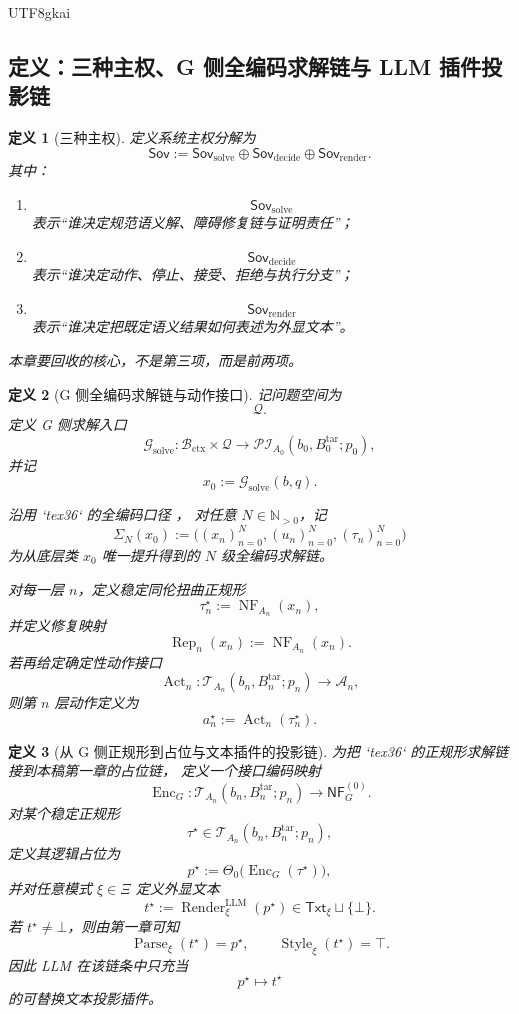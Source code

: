 \documentclass[12pt]{article}
\newtheorem{definition}{定义}[section]
\newcommand{\Parse}{\operatorname{Parse}}
\newcommand{\Render}{\operatorname{Render}}
\newcommand{\Style}{\operatorname{Style}}
\begin{document}
\begin{CJK*}{UTF8}{gkai}
\subsection{定义：三种主权、G 侧全编码求解链与 LLM 插件投影链}
\label{subsec:tex37-ch6-definitions}

\begin{definition}[三种主权]
\label{def:tex37-ch6-sovereignty}
定义系统主权分解为
\[
  \mathsf{Sov}
  :=
  \mathsf{Sov}_{\mathrm{solve}}
  \oplus
  \mathsf{Sov}_{\mathrm{decide}}
  \oplus
  \mathsf{Sov}_{\mathrm{render}}.
\]
其中：
\begin{enumerate}
  \item
  \[
    \mathsf{Sov}_{\mathrm{solve}}
  \]
  表示“谁决定规范语义解、障碍修复链与证明责任”；
  \item
  \[
    \mathsf{Sov}_{\mathrm{decide}}
  \]
  表示“谁决定动作、停止、接受、拒绝与执行分支”；
  \item
  \[
    \mathsf{Sov}_{\mathrm{render}}
  \]
  表示“谁决定把既定语义结果如何表述为外显文本”。
\end{enumerate}
本章要回收的核心，不是第三项，而是前两项。
\end{definition}

\begin{definition}[G 侧全编码求解链与动作接口]
\label{def:tex37-ch6-g-solve}
记问题空间为
\[
  \mathcal{Q}.
\]
定义 G 侧求解入口
\[
  \mathcal{G}_{\mathrm{solve}}:
  \mathcal{B}_{\mathrm{ctx}}\times\mathcal{Q}
  \to
  \mathcal{PI}_{A_0}(b_0,B_0^{\mathrm{tar}};p_0),
\]
并记
\[
  x_0:=\mathcal{G}_{\mathrm{solve}}(b,q).
\]

沿用 `tex36` 的全编码口径 \cite{RepoTex36HomotopyTwistBijection}，
对任意 $N\in\mathbb{N}_{>0}$，记
\[
  \Sigma_N(x_0)
  :=
  \bigl(
    (x_n)_{n=0}^{N},
    (u_n)_{n=0}^{N},
    (\tau_n)_{n=0}^{N}
  \bigr)
\]
为从底层类 $x_0$ 唯一提升得到的 $N$ 级全编码求解链。

对每一层 $n$，定义稳定同伦扭曲正规形
\[
  \tau_n^\star:=\operatorname{NF}_{A_n}(x_n),
\]
并定义修复映射
\[
  \operatorname{Rep}_n(x_n):=\operatorname{NF}_{A_n}(x_n).
\]
若再给定确定性动作接口
\[
  \operatorname{Act}_n:
  \mathcal{T}_{A_n}(b_n,B_n^{\mathrm{tar}};p_n)
  \to
  \mathcal{A}_n,
\]
则第 $n$ 层动作定义为
\[
  a_n^\star:=\operatorname{Act}_n(\tau_n^\star).
\]
\end{definition}

\begin{definition}[从 G 侧正规形到占位与文本插件的投影链]
\label{def:tex37-ch6-plugin}
为把 `tex36` 的正规形求解链接到本稿第一章的占位链，
定义一个接口编码映射
\[
  \operatorname{Enc}_G:
  \mathcal{T}_{A_n}(b_n,B_n^{\mathrm{tar}};p_n)
  \to
  \mathsf{NF}_G^{(0)}.
\]
对某个稳定正规形
\[
  \tau^\star\in \mathcal{T}_{A_n}(b_n,B_n^{\mathrm{tar}};p_n),
\]
定义其逻辑占位为
\[
  p^\star:=\Theta_0\bigl(\operatorname{Enc}_G(\tau^\star)\bigr),
\]
并对任意模式 $\xi\in\Xi$ 定义外显文本
\[
  t^\star:=\Render^{\mathrm{LLM}}_\xi(p^\star)\in \mathsf{Txt}_\xi\sqcup\{\bot\}.
\]
若 $t^\star\neq\bot$，则由第一章可知
\[
  \Parse_\xi(t^\star)=p^\star,
  \qquad
  \Style_\xi(t^\star)=\top.
\]
因此 LLM 在该链条中只充当
\[
  p^\star\mapsto t^\star
\]
的可替换文本投影插件。
\end{definition}


\end{CJK*}
\end{document}
